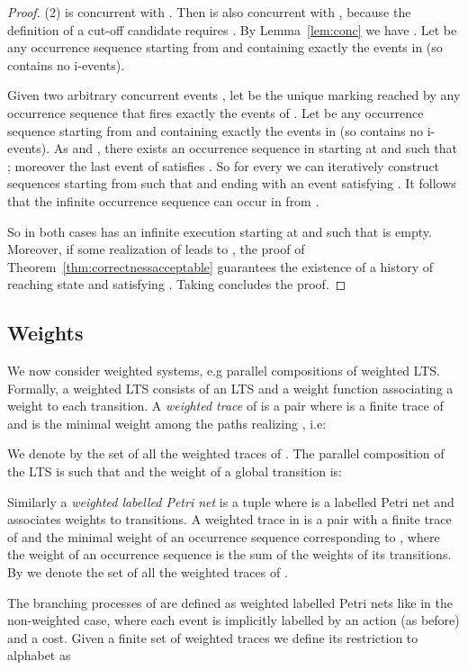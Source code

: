 \documentclass{llncs}
\begin{document}
\begin{proof}
(2)  is concurrent with .  Then  is also concurrent with , because the definition of a cut-off candidate requires . By Lemma~\ref{lem:conc} we have . Let  be any occurrence sequence starting from  and containing exactly the events in  (so  contains no i-events).

Given two arbitrary concurrent events , let  be the unique marking reached by any occurrence sequence that fires exactly the events of . Let  be any occurrence sequence starting from  and containing exactly the events in  (so  contains no i-events).
As  and , there exists  an occurrence sequence  in  starting at  and such that ; moreover the last event  of  satisfies . So for every  we can iteratively
construct sequences  starting from  such that  and ending with an event  satisfying . It follows that the infinite occurrence sequence  can occur in  from .

So in both cases  has an infinite execution  starting at  and such that  is empty.
Moreover, if some realization of  leads to , the proof of Theorem~\ref{thm:correctnessacceptable} guarantees the existence of a history  of  reaching state  and satisfying .
Taking  concludes the proof.
\end{proof}

\subsection{Weights}
We now consider weighted systems, e.g parallel compositions of weighted LTS.
Formally, a weighted LTS  consists of an LTS  and a weight function  associating a weight to each transition.
A \emph{weighted trace} of  is a pair  where  is a finite trace of  and  is the minimal weight among the paths realizing , i.e:

We denote by  the set of all the weighted traces of .
The parallel composition  of the LTS  is such that  and the weight of a global transition  is: 


Similarly a \emph{weighted labelled Petri net} is a tuple  where  is a labelled Petri net and  associates weights to transitions.
A weighted trace in  is a pair  with  a finite trace of  and  the minimal weight of an occurrence sequence corresponding to , where the weight of an occurrence sequence is the sum of the weights of its transitions.
By  we denote the set of all the weighted traces of .

The branching processes of  are defined as weighted labelled Petri nets like in the non-weighted case, where
each event is implicitly labelled by an action (as before) and a cost.
Given a finite set of weighted traces  we define its restriction to alphabet  as 
\end{document}
